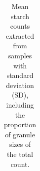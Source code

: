 \documentclass[
  b5paper,
]{book}
\begin{document}
\begin{longtable}[]{@{}
  >{\raggedright\arraybackslash}p{}
  >{\raggedright\arraybackslash}p{}
  >{\raggedright\arraybackslash}p{}
  >{\raggedleft\arraybackslash}p{}
  >{\raggedright\arraybackslash}p{}
  >{\raggedleft\arraybackslash}p{}
  >{\raggedright\arraybackslash}p{}
  >{\raggedleft\arraybackslash}p{}
  >{\raggedright\arraybackslash}p{}
  >{\raggedleft\arraybackslash}p{}@{}}

\caption{\label{tbl-sample-count}Mean starch counts extracted from
samples with standard deviation (SD), including the proportion of
granule sizes of the total count.}

\tabularnewline


\end{longtable}
\end{document}
